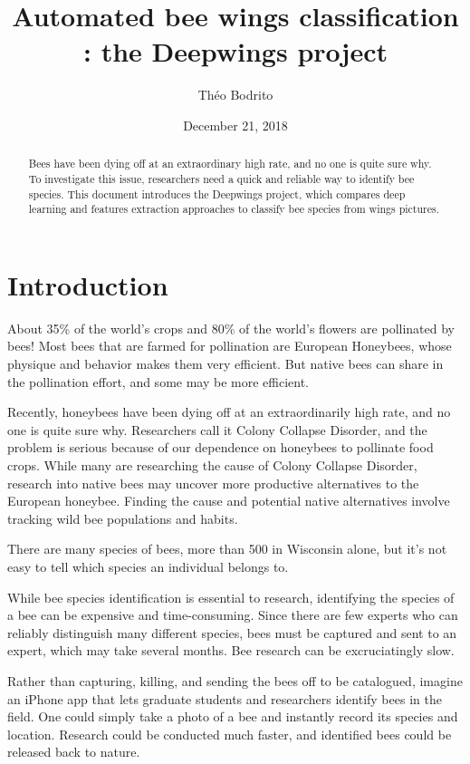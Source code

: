 \documentclass[a4paper]{article}
\title{Automated bee wings classification : the Deepwings project}
\author{Théo Bodrito}
\date{December 21, 2018}
\begin{document}
\maketitle

\begin{abstract}
    Bees have been dying off at an extraordinary high rate, and no one is quite sure why. To investigate this issue, researchers need a quick and reliable way to identify bee species. This document introduces the Deepwings project, which compares deep learning and features extraction approaches to classify bee species from wings pictures.


\end{abstract}

\section{Introduction}
\label{sec:introduction}

About 35\% of the world's crops and 80\% of the world’s flowers are pollinated by bees! Most bees that are farmed for pollination are European Honeybees, whose physique and behavior makes them very efficient. But native bees can share in the pollination effort, and some may be more efficient.

Recently, honeybees have been dying off at an extraordinarily high rate, and no one is quite sure why. Researchers call it Colony Collapse Disorder, and the problem is serious because of our dependence on honeybees to pollinate food crops. While many are researching the cause of Colony Collapse Disorder, research into native bees may uncover more productive alternatives to the European honeybee. Finding the cause and potential native alternatives involve tracking wild bee populations and habits.

There are many species of bees, more than 500 in Wisconsin alone, but it's not easy to tell which species an individual belongs to.

While bee species identification is essential to research, identifying the species of a bee can be expensive and time-consuming. Since there are few experts who can reliably distinguish many different species, bees must be captured and sent to an expert, which may take several months. Bee research can be excruciatingly slow.

Rather than capturing, killing, and sending the bees off to be catalogued, imagine an iPhone app that lets graduate students and researchers identify bees in the field. One could simply take a photo of a bee and instantly record its species and location. Research could be conducted much faster, and identified bees could be released back to nature.
\end{document}
